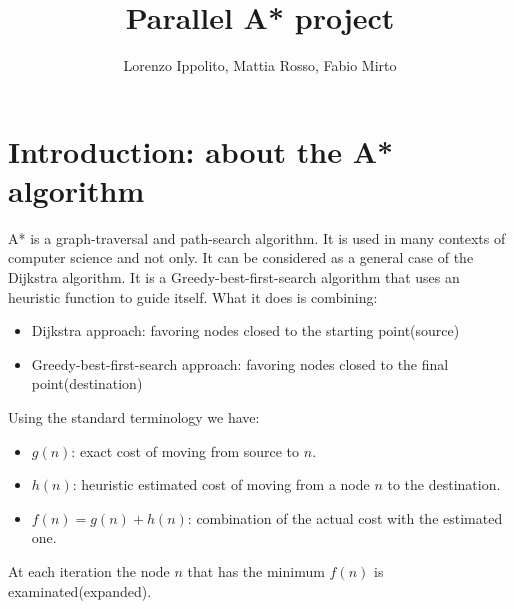 \documentclass[twocolumn, switch]{article} %
\title{Parallel A* project}
\author{Lorenzo Ippolito, Mattia Rosso, Fabio Mirto}
\begin{document}




\section{Introduction: about the A* algorithm}
A* is a graph-traversal and path-search algorithm. It is used in many contexts of computer science and 
not only. It can be considered as a general case of the Dijkstra algorithm. It is a Greedy-best-first-search algorithm that uses an heuristic function to guide
itself. What it does is combining:
\begin{itemize}
  \item Dijkstra approach: favoring nodes closed to the starting point(source)
  \item Greedy-best-first-search approach: favoring nodes closed to the final point(destination)
\end{itemize}
Using the standard terminology we have:
\begin{itemize}
  \item $g(n)$: exact cost of moving from source to $n$.
  \item $h(n)$: heuristic estimated cost of moving from a node $n$ to the destination.
  \item $f(n) = g(n) + h(n)$: combination of the actual cost with the estimated one.
\end{itemize}
At each iteration the node $n$ that has the minimum $f(n)$ is examinated(expanded).
\end{document}
